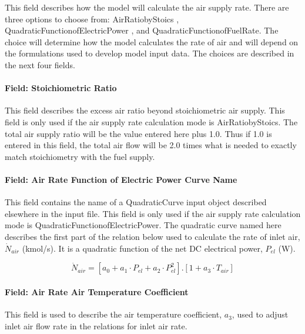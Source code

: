 This field describes how the model will calculate the air supply rate. There are three options to choose from: AirRatiobyStoics , QuadraticFunctionofElectricPower , and QuadraticFunctionofFuelRate. The choice will determine how the model calculates the rate of air and will depend on the formulations used to develop model input data. The choices are described in the next four fields.

\paragraph{Field: Stoichiometric Ratio}\label{field-stoichiometric-ratio}

This field describes the excess air ratio beyond stoichiometric air supply. This field is only used if the air supply rate calculation mode is AirRatiobyStoics. The total air supply ratio will be the value entered here plus 1.0. Thus if 1.0 is entered in this field, the total air flow will be 2.0 times what is needed to exactly match stoichiometry with the fuel supply.

\paragraph{Field: Air Rate Function of Electric Power Curve Name}\label{field-air-rate-function-of-electric-power-curve-name}

This field contains the name of a QuadraticCurve input object described elsewhere in the input file. This field is only used if the air supply rate calculation mode is QuadraticFunctionofElectricPower. The quadratic curve named here describes the first part of the relation below used to calculate the rate of inlet air, \({\dot N_{air}}\) (kmol/s). It is a quadratic function of the net DC electrical power, \({P_{el}}\) (W).

\begin{equation}
{\dot N_{air}} = \left[ {{a_0} + {a_1} \cdot {P_{el}} + {a_2} \cdot P_{el}^2} \right].\left[ {1 + {a_3} \cdot {T_{air}}} \right]
\end{equation}

\paragraph{Field: Air Rate Air Temperature Coefficient}\label{field-air-rate-air-temperature-coefficient}

This field is used to describe the air temperature coefficient, \({a_3}\), used to adjust inlet air flow rate in the relations for inlet air rate.

